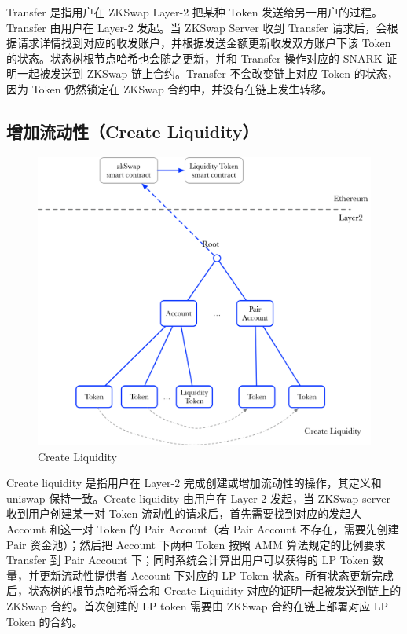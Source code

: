 \documentclass[]{template/llncs}
\begin{document}
Transfer 是指用户在 ZKSwap Layer-2 把某种 Token 发送给另一用户的过程。Transfer 由用户在 Layer-2 发起。当 ZKSwap Server 收到 Transfer 请求后，会根据请求详情找到对应的收发账户，并根据发送金额更新收发双方账户下该 Token 的状态。状态树根节点哈希也会随之更新，并和 Transfer 操作对应的 SNARK 证明一起被发送到 ZKSwap 链上合约。Transfer 不会改变链上对应 Token 的状态，因为 Token 仍然锁定在 ZKSwap 合约中，并没有在链上发生转移。

\pagebreak

\subsection{增加流动性（Create Liquidity）}

\begin{figure}[htbp]
\centering
\includegraphics[width=0.9\columnwidth]{figure/create_liquidity}
\caption{Create Liquidity}
\label{fig:create_liquidity}
\end{figure}

Create liquidity 是指用户在 Layer-2 完成创建或增加流动性的操作，其定义和 uniswap 保持一致。Create liquidity 由用户在 Layer-2 发起，当 ZKSwap server 收到用户创建某一对 Token 流动性的请求后，首先需要找到对应的发起人 Account 和这一对 Token 的 Pair Account（若 Pair Account 不存在，需要先创建 Pair 资金池）；然后把 Account 下两种 Token 按照 AMM 算法规定的比例要求 Transfer 到 Pair Account 下；同时系统会计算出用户可以获得的 LP Token 数量，并更新流动性提供者 Account 下对应的 LP Token 状态。所有状态更新完成后，状态树的根节点哈希将会和 Create Liquidity 对应的证明一起被发送到链上的 ZKSwap 合约。首次创建的 LP token 需要由 ZKSwap 合约在链上部署对应 LP Token 的合约。
\end{document}
